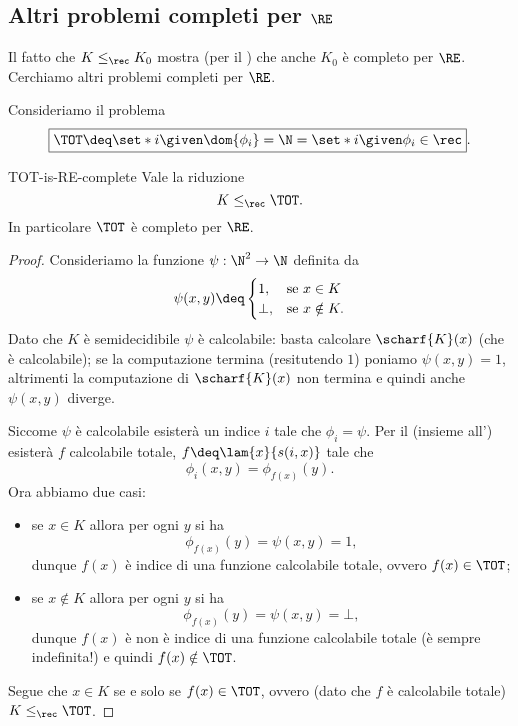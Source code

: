 \subsection{Altri problemi completi per $\RE$}

Il fatto che $K \leq_\rec K_0$ mostra (per il ) che anche $K_0$ è completo per $\RE$. Cerchiamo altri problemi completi per $\RE$.


Consideriamo il problema \[
    \boxed{\TOT \deq \set*{i \given \dom{\phi_i} = \N} = \set*{i \given \phi_i \in \rec}}.
\]

\begin{proposition}{}{TOT-is-RE-complete}
    Vale la riduzione \[
        K \leq_\rec \TOT.
    \] In particolare $\TOT$ è completo per $\RE$. 
\end{proposition}
\begin{proof}
    Consideriamo la funzione $\psi : \N^2 \to \N$ definita da \[
        \psi(x, y) \deq \begin{cases}
            1, &\text{se } x \in K \\
            \bot, &\text{se } x \notin K.
        \end{cases}
    \] Dato che $K$ è semidecidibile $\psi$ è calcolabile: basta calcolare $\scharf{K}(x)$ (che è calcolabile); se la computazione termina (resitutendo $1$) poniamo $\psi(x, y) = 1$, altrimenti la computazione di $\scharf{K}(x)$ non termina e quindi anche $\psi(x, y)$ diverge.

    Siccome $\psi$ è calcolabile esisterà un indice $i$ tale che $\phi_i = \psi$. Per il  (insieme all') esisterà $f$ calcolabile totale, $f \deq \lam{x}{s(i, x)}$ tale che \[
        \phi_i(x, y) = \phi_{f(x)}(y).
    \] Ora abbiamo due casi: \begin{itemize}
        \item se $x \in K$ allora per ogni $y$ si ha \[
            \phi_{f(x)}(y) = \psi(x, y) = 1,
        \] dunque $f(x)$ è indice di una funzione calcolabile totale, ovvero $f(x) \in \TOT$;
        \item se $x \notin K$ allora per ogni $y$ si ha \[
            \phi_{f(x)}(y) = \psi(x, y) = \bot,
        \] dunque $f(x)$ è non è indice di una funzione calcolabile totale (è sempre indefinita!) e quindi $f(x) \notin \TOT$.   
    \end{itemize}

    Segue che $x \in K$ se e solo se $f(x) \in \TOT$, ovvero (dato che $f$ è calcolabile totale) $K \leq_\rec \TOT$.  
\end{proof}
